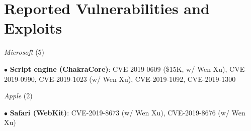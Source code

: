 \section*{Reported Vulnerabilities and Exploits}
\begin{description}

\item {\emph{Microsoft} (5)}
	\item $\bullet$ \textbf{Script engine (ChakraCore)}: CVE-2019-0609 (\$15K, w/ Wen Xu), CVE-2019-0990, CVE-2019-1023 (w/ Wen Xu), CVE-2019-1092, CVE-2019-1300

\item {\emph{Apple} (2)}
\item $\bullet$ \textbf{Safari (WebKit)}: CVE-2019-8673 (w/ Wen Xu), CVE-2019-8676 (w/ Wen Xu)

\end{description}
